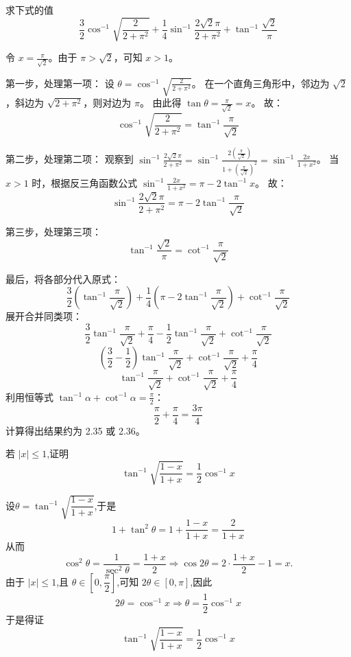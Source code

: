 \begin{questions}
    \question
求下式的值
\[
\frac{3}{2} \cos^{-1} \sqrt{\frac{2}{2 + \pi^2}} + \frac{1}{4} \sin^{-1} \frac{2\sqrt{2} \pi}{2 + \pi^2} + \tan^{-1} \frac{\sqrt{2}}{\pi}
\]

\begin{solution}
令 $x = \frac{\pi}{\sqrt{2}}$。由于 $\pi > \sqrt{2}$，可知 $x > 1$。

第一步，处理第一项：
设 $\theta = \cos^{-1} \sqrt{\frac{2}{2 + \pi^2}}$。
在一个直角三角形中，邻边为 $\sqrt{2}$，斜边为 $\sqrt{2 + \pi^2}$，则对边为 $\pi$。
由此得 $\tan \theta = \frac{\pi}{\sqrt{2}} = x$。
故：
\[
\cos^{-1} \sqrt{\frac{2}{2 + \pi^2}} = \tan^{-1} \frac{\pi}{\sqrt{2}}
\]

第二步，处理第二项：
观察到 $\sin^{-1} \frac{2\sqrt{2} \pi}{2 + \pi^2} = \sin^{-1} \frac{2(\frac{\pi}{\sqrt{2}})}{1 + (\frac{\pi}{\sqrt{2}})^2} = \sin^{-1} \frac{2x}{1 + x^2}$。
当 $x > 1$ 时，根据反三角函数公式 $\sin^{-1} \frac{2x}{1+x^2} = \pi - 2 \tan^{-1} x$。
故：
\[
\sin^{-1} \frac{2\sqrt{2} \pi}{2 + \pi^2} = \pi - 2 \tan^{-1} \frac{\pi}{\sqrt{2}}
\]

第三步，处理第三项：
\[
\tan^{-1} \frac{\sqrt{2}}{\pi} = \cot^{-1} \frac{\pi}{\sqrt{2}}
\]

最后，将各部分代入原式：
\[
\frac{3}{2} \left( \tan^{-1} \frac{\pi}{\sqrt{2}} \right) + \frac{1}{4} \left( \pi - 2 \tan^{-1} \frac{\pi}{\sqrt{2}} \right) + \cot^{-1} \frac{\pi}{\sqrt{2}}
\]
展开合并同类项：
\[
\frac{3}{2} \tan^{-1} \frac{\pi}{\sqrt{2}} + \frac{\pi}{4} - \frac{1}{2} \tan^{-1} \frac{\pi}{\sqrt{2}} + \cot^{-1} \frac{\pi}{\sqrt{2}}
\]
\[
\left( \frac{3}{2} - \frac{1}{2} \right) \tan^{-1} \frac{\pi}{\sqrt{2}} + \cot^{-1} \frac{\pi}{\sqrt{2}} + \frac{\pi}{4}
\]
\[
\tan^{-1} \frac{\pi}{\sqrt{2}} + \cot^{-1} \frac{\pi}{\sqrt{2}} + \frac{\pi}{4}
\]
利用恒等式 $\tan^{-1} \alpha + \cot^{-1} \alpha = \frac{\pi}{2}$：
\[
\frac{\pi}{2} + \frac{\pi}{4} = \frac{3\pi}{4}
\]
计算得出结果约为 2.35 或 2.36。
\end{solution}

    \question 若 $|x|\le 1$,证明
    \[
    \tan^{-1}\sqrt{\frac{1-x}{1+x}}=\frac{1}{2}\cos^{-1}x
    \]
    \begin{solution}
        设$\theta=\tan^{-1}\sqrt{\dfrac{1-x}{1+x}}$,于是
        \[
        1+\tan^2\theta=1+\frac{1-x}{1+x}=\frac{2}{1+x}
        \]
        从而
        \[
        \cos^2\theta=\frac{1}{\sec^2\theta}=\frac{1+x}{2} \Rightarrow \cos2\theta=2\cdot\frac{1+x}{2}-1=x.
        \]
        由于 $|x|\le 1$,且 $\theta \in \left[0,\dfrac{\pi}{2}\right]$,可知 $2\theta\in[0,\pi]$,因此
        \[
        2\theta=\cos^{-1}x \Rightarrow \theta=\frac{1}{2}\cos^{-1}x
        \]
        于是得证
        \[
        \tan^{-1}\sqrt{\frac{1-x}{1+x}}=\frac{1}{2}\cos^{-1}x
        \]
    \end{solution}


\end{questions}
